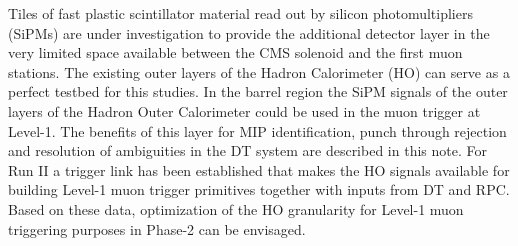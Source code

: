 \documentclass[11pt]{amsart}
\begin{document}
Tiles of fast plastic scintillator material read out by silicon photomultipliers (SiPMs) are under investigation to provide the additional detector layer in the very limited space available 
between the CMS solenoid and the first muon stations. The existing outer layers of the Hadron Calorimeter (HO)  can serve as a perfect testbed for this studies. In the barrel region the 
SiPM signals of the outer layers of the Hadron Outer Calorimeter could be used in the muon trigger at Level-1. The benefits of this layer for MIP identification, punch through rejection 
and resolution of ambiguities in the DT system are described in this note. For Run II a trigger link has been established that makes the HO signals available for building Level-1 muon 
trigger primitives together with inputs from DT and RPC. Based on these data, optimization of the HO granularity for Level-1 muon triggering purposes in Phase-2 can be envisaged. 
\end{document}
